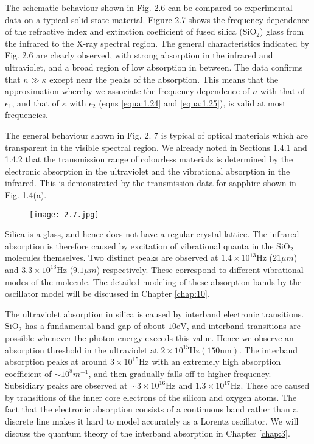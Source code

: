 \documentclass[12pt]{book}
\begin{document}
The schematic behaviour shown in Fig. 2.6 can be compared to experimental data on a typical solid state material. Figure 2.7 shows the frequency dependence of the refractive index and extinction coefficient of fused silica ($\mathrm{SiO_2}$) glass from the infrared to the X-ray spectral region. The general characteristics indicated by Fig. 2.6 are clearly observed, with strong absorption in the infrared and ultraviolet, and a broad region of low absorption in between. The data confirms that $n\gg\kappa$ except near the peaks of the absorption. This means that the approximation whereby we associate the frequency dependence of $n$ with that of $\epsilon_1$, and that of $\kappa$ with $\epsilon_2$ (eqns \ref{equa:1.24} and \ref{equa:1.25}), is valid at most frequencies.

The general behaviour shown in Fig. 2. 7 is typical of optical materials which are transparent in the visible spectral region. We already noted in Sections 1.4.1 and 1.4.2 that the transmission range of colourless materials is determined by the electronic absorption in the ultraviolet and the vibrational absorption in the infrared. This is demonstrated by the transmission data for sapphire shown in Fig. 1.4(a).

\begin{figure}[htbp]
  \texttt{[image: 2.7.jpg]}\\
  \label{fig:2.7}
\end{figure}

Silica is a glass, and hence does not have a regular crystal lattice. The infrared absorption is therefore caused by excitation of vibrational quanta in the $\mathrm{SiO_2}$ molecules themselves. Two distinct peaks are observed at $1.4\times10^{13}$Hz ($21\mu m$) and $3.3\times10^{13}$Hz ($9.1\mu m$) respectively. These correspond to different vibrational modes of the molecule. The detailed modeling of these absorption bands by the oscillator model will be discussed in Chapter \ref{chap:10}.

The ultraviolet absorption in silica is caused by interband electronic transitions. $\mathrm{SiO_2}$ has a fundamental band gap of about $\mathrm{10 eV}$, and interband transitions are possible whenever the photon energy exceeds this value. Hence we observe an absorption threshold in the ultraviolet at $\mathrm{2\times10^{15}Hz (150nm)}$. The interband absorption peaks at around $3\times10^{15}$Hz with an extremely high absorption coefficient of $\sim10^8 m^{-1}$, and then gradually falls off to higher frequency. Subsidiary peaks are observed at $\sim3\times 10^{16}$Hz and $1.3\times10^17$Hz. These are caused by transitions of the inner core electrons of the silicon and oxygen atoms. The fact that the electronic absorption consists of a continuous band rather than a discrete line makes it hard to model accurately as a Lorentz oscillator. We will discuss the quantum theory of the interband absorption in Chapter \ref{chap:3}.
\end{document}
